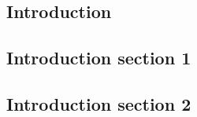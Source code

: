 
\begin{bibunit}
\setcounter{chapter}{0}
\chapter{Introduction}\label{chap:1}

\lipsum[60]

\section{Introduction section 1}\label{sec:1_1}

\lipsum[60]

% 


\section{Introduction section 2}\label{sec:1_2}

\lipsum[60]

% 

\lipsum[60]


\putbib
\end{bibunit}

% 